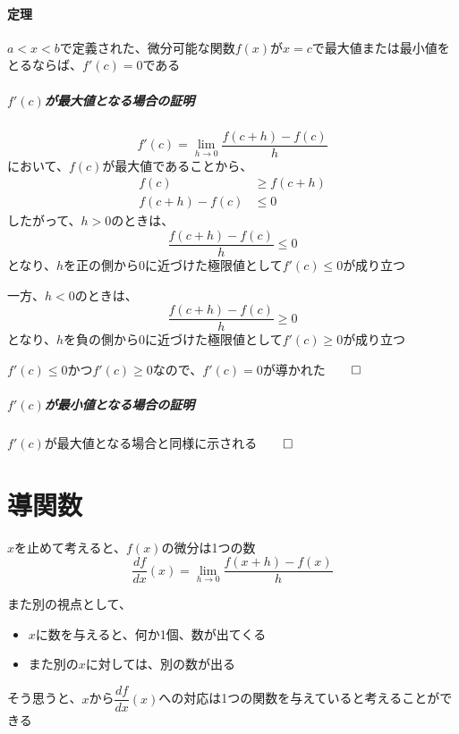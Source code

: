 \documentclass[../book_jiriki_calc]{subfiles}
\begin{document}
\paragraph{定理}

$a<x<b$で定義された、微分可能な関数$f(x)$が$x=c$で最大値または最小値をとるならば、$f'(c)=0$である

\sectionline

\subparagraph{$f'(c)$が最大値となる場合の証明}

\begin{equation}
  f'(c) = \lim_{h\to 0}\dfrac{f(c+h)-f(c)}{h}
\end{equation}
において、$f(c)$が最大値であることから、
\begin{align}
  f(c)        & \geq f(c+h) \\
  f(c+h)-f(c) & \leq 0
\end{align}
したがって、$h>0$のときは、
\begin{equation}
  \dfrac{f(c+h)-f(c)}{h} \leq 0
\end{equation}
となり、$h$を正の側から$0$に近づけた極限値として$f'(c) \leq 0$が成り立つ

一方、$h<0$のときは、
\begin{equation}
  \dfrac{f(c+h)-f(c)}{h} \geq 0
\end{equation}
となり、$h$を負の側から$0$に近づけた極限値として$f'(c) \geq 0$が成り立つ

$f'(c) \leq 0$かつ$f'(c) \geq 0$なので、$f'(c)=0$が導かれた$\qed$

\sectionline

\subparagraph{$f'(c)$が最小値となる場合の証明}

$f'(c)$が最大値となる場合と同様に示される$\qed$

\section{導関数}

$x$を止めて考えると、$f(x)$の微分は1つの数
\begin{equation}
  \dfrac{df}{dx}(x) = \lim_{h\to 0}\dfrac{f(x+h)-f(x)}{h}
\end{equation}

\br

また別の視点として、
\begin{itemize}
  \item $x$に数を与えると、何か1個、数が出てくる
  \item また別の$x$に対しては、別の数が出る
\end{itemize}
そう思うと、$x$から$\dfrac{df}{dx}(x)$への対応は1つの関数を与えていると考えることができる
\end{document}
